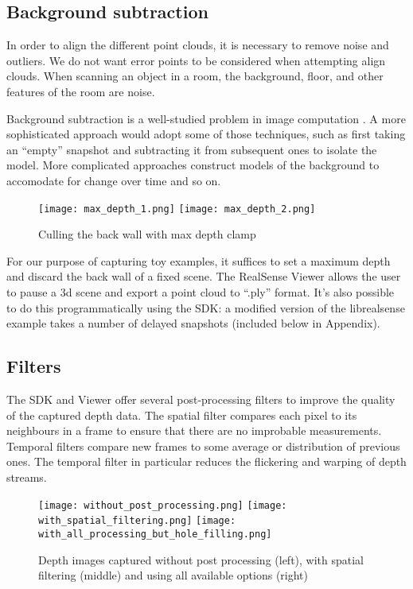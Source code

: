 \subsection{Background subtraction}

In order to align the different point clouds, it is necessary to remove noise and
outliers. We do not want error points to be considered when attempting align clouds.
When scanning an object in a room, the background, floor, and other features
of the room are noise.

Background subtraction is a well-studied problem in image computation \cite{piccardi2004background}.
A more sophisticated approach would adopt some of those techniques, such as
first taking an ``empty'' snapshot and subtracting it from subsequent ones to
isolate the model. More complicated approaches construct models of the background
to accomodate for change over time and so on.

\begin{figure}[h]
\centering
\texttt{[image: max\_depth\_1.png]}
\texttt{[image: max\_depth\_2.png]}
\caption{Culling the back wall with max depth clamp}
\end{figure}

For our purpose of capturing toy examples, it suffices to set a maximum depth
and discard the back wall of a fixed scene. The RealSense Viewer allows the user
to pause a 3d scene and export a point cloud to ``.ply'' format. It's also possible to do this programmatically using the SDK: a modified version of the librealsense  example
takes a number of delayed snapshots (included below in Appendix).

\subsection{Filters}

The SDK and Viewer offer several post-processing filters to improve the quality of
the captured depth data. The spatial filter compares each pixel to its neighbours in a
frame to ensure that there are no improbable measurements. Temporal filters
compare new frames to some average or distribution of previous ones. The temporal
filter in particular reduces the flickering and warping of depth streams.

\begin{figure}[h]
\centering
\texttt{[image: without\_post\_processing.png]}
\texttt{[image: with\_spatial\_filtering.png]}
\texttt{[image: with\_all\_processing\_but\_hole\_filling.png]}
\caption{Depth images captured without post processing (left), with spatial filtering (middle)
and using all available options (right)}
\end{figure}

